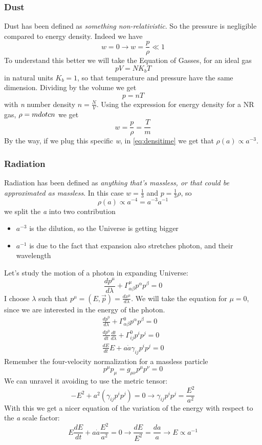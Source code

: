 \subsubsection{Dust}
Dust has been defined as \emph{something non-relativistic}. So the pressure is negligible compared to energy density. Indeed we have 
\[
w = 0 \to w = \frac{p}{\rho }\ll 1
\]
To understand this better we will take the Equation of Gasses, for an ideal gas
\[
pV = NK_{b}T
\]
in natural units $K_{b}=1$, so that temperature and pressure have the same dimension. Dividing by the volume we get
\[
p = nT
\]
with \emph{n} number density $n = \frac{N}{V}$. Using the expression for energy density for a NR gas, $\rho = m\\dot{c}n$ we get
\[
w = \frac{p}{\rho }  = \frac{T}{m}
\]
By the way, if we plug this specific \emph{w}, in \ref{eq:densitime} we get that $\rho \left( a \right) \propto a^{-3}  $.

\subsubsection{Radiation}
Radiation has been defined as \emph{anything that's massless, or that could be approximated as massless}. In this case $w = \frac{1}{3}$ and $p = \frac{1}{3}\rho $, so 
\[
\rho \left( a \right) \propto a^{-4} = a^{-3}a^{-1}
\]
we split the \emph{a} into two contribution
\begin{itemize}
\item $a^{-3}$ is the dilution, so the Universe is getting bigger
\item $a^{-1}$ is due to the fact that expansion also stretches photon, and their wavelength
\end{itemize}
Let's study the motion of a photon in expanding Universe:
\[
	\frac{d p^{\mu }}{d \lambda } + \Gamma _{\alpha \beta }^{\mu }p^{\alpha }p^{\beta } =0
\]
I choose $\lambda $ such that $p^{\mu } = \left( E, \vec{p} \right) = \frac{d x^{\mu }}{d \lambda }$. We will take the equation for $\mu  = 0$, since we are interested in the energy of the photon.
\begin{gather*}
\frac{d p^{0}}{d \lambda } + \Gamma ^{0}_{\alpha \beta }p^{\alpha }p^{\beta } = 0\\
\frac{d p^{0}}{d t}\frac{d t}{d \lambda } + \Gamma ^{0}_{ij}p^{i}p^{j} = 0 \\
\frac{d E}{d t} E + a \dot{a} \gamma _{ij}p^{i}p^{j} = 0
\end{gather*}
Remember the four-velocity normalization for a massless particle 
\[
p^{\mu }p_{\mu } = g_{\mu \nu }p^{\mu }p^{\nu }=0
\]
We can unravel it avoiding to use the metric tensor:
\[
-E^{2} + a^{2}\left( \gamma _{ij}p^{i}p^{j} \right) = 0 \to  \gamma _{ij}p^{i}p^{j} = \frac{E^{2}}{a^{2}}
\]
With this we get a nicer equation of the variation of the energy with respect to the \emph{a} scale factor:
\[
E \frac{d E}{d t} + a \dot{a} \frac{E^{2}}{a^{2}} = 0 \to  \frac{d E}{E^{2}} = \frac{d a}{a} \to E\propto a^{-1}
\]

